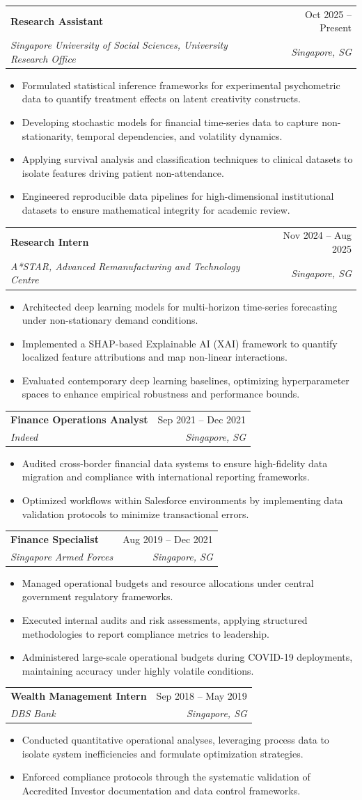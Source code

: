 \documentclass[a4paper,11pt]{article}
\makeatletter
\newcommand{\resumeItem}[1]{
  \item\small{
    {#1 \vspace{-2pt}}
  }
}
\newcommand{\resumeSubheading}[4]{
  \vspace{-2pt}\item
    \begin{tabular*}{0.97\textwidth}[t]{l@{\extracolsep{\fill}}r}
      \textbf{#1} & #2 \\
      \textit{\small#3} & \textit{\small #4} \\
    \end{tabular*}\vspace{-7pt}
}
\newcommand{\resumeItemListStart}{\begin{itemize}}
\newcommand{\resumeItemListEnd}{\end{itemize}\vspace{-5pt}}
\makeatother
\begin{document}
\resumeSubheading
{Research Assistant}{Oct 2025 -- Present}
{Singapore University of Social Sciences, University Research Office}{Singapore, SG}
\resumeItemListStart
    \resumeItem{Formulated statistical inference frameworks for experimental psychometric data to quantify treatment effects on latent creativity constructs.}
    \resumeItem{Developing stochastic models for financial time-series data to capture non-stationarity, temporal dependencies, and volatility dynamics.}
    \resumeItem{Applying survival analysis and classification techniques to clinical datasets to isolate features driving patient non-attendance.}
    \resumeItem{Engineered reproducible data pipelines for high-dimensional institutional datasets to ensure mathematical integrity for academic review.}
\resumeItemListEnd

\resumeSubheading
{Research Intern}{Nov 2024 -- Aug 2025}
{A*STAR, Advanced Remanufacturing and Technology Centre}{Singapore, SG}
\resumeItemListStart
    \resumeItem{Architected deep learning models for multi-horizon time-series forecasting under non-stationary demand conditions.}
    \resumeItem{Implemented a SHAP-based Explainable AI (XAI) framework to quantify localized feature attributions and map non-linear interactions.}
    \resumeItem{Evaluated contemporary deep learning baselines, optimizing hyperparameter spaces to enhance empirical robustness and performance bounds.}
\resumeItemListEnd

\resumeSubheading
{Finance Operations Analyst}{Sep 2021 -- Dec 2021}
{Indeed}{Singapore, SG}
\resumeItemListStart
    \resumeItem{Audited cross-border financial data systems to ensure high-fidelity data migration and compliance with international reporting frameworks.}
    \resumeItem{Optimized workflows within Salesforce environments by implementing data validation protocols to minimize transactional errors.}
\resumeItemListEnd

\resumeSubheading
{Finance Specialist}{Aug 2019 -- Dec 2021}
{Singapore Armed Forces}{Singapore, SG}
\resumeItemListStart
    \resumeItem{Managed operational budgets and resource allocations under central government regulatory frameworks.}
    \resumeItem{Executed internal audits and risk assessments, applying structured methodologies to report compliance metrics to leadership.}
    \resumeItem{Administered large-scale operational budgets during COVID-19 deployments, maintaining accuracy under highly volatile conditions.}
\resumeItemListEnd

\resumeSubheading
{Wealth Management Intern}{Sep 2018 -- May 2019}
{DBS Bank}{Singapore, SG}
\resumeItemListStart
    \resumeItem{Conducted quantitative operational analyses, leveraging process data to isolate system inefficiencies and formulate optimization strategies.}
    \resumeItem{Enforced compliance protocols through the systematic validation of Accredited Investor documentation and data control frameworks.}
\resumeItemListEnd
\end{document}

